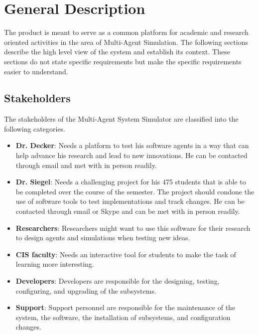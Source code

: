 
\chapter{General Description}\label{chapter:general}

The product is meant to serve as a common platform for academic and research oriented activities in the area of Multi-Agent Simulation. The following sections describe the high level view of the system and establish its context. These sections do not state specific requirements but make the specific requirements easier to understand.

\section{Stakeholders}
The stakeholders of the Multi-Agent System Simulator are classified into the following categories.

\begin{itemize}
\item{\textbf{Dr. Decker}: Needs a platform to test his software agents in a way that can help advance his research and lead to new innovations. He can be contacted through email and met with in person readily.}

\item{\textbf{Dr. Siegel}: Needs a challenging project for his 475 students that is able to be completed over the course of the semester. The project should condone the use of software tools to test implementations and  track changes. He can be contacted through email or Skype and can be met with in person readily.}

\item{\textbf{Researchers}: Researchers might want to use this software for their research to design agents and simulations when testing new ideas.}

\item{\textbf{CIS faculty}: Needs an interactive tool for students to make the task of learning more interesting.}

\item{\textbf{Developers}: Developers are responsible for the designing, testing, configuring, and upgrading of the subsystems.}

\item{\textbf{Support}: Support personnel are responsible for the maintenance of the system, the software, the installation of subsystems, and configuration changes.}
\end{itemize}